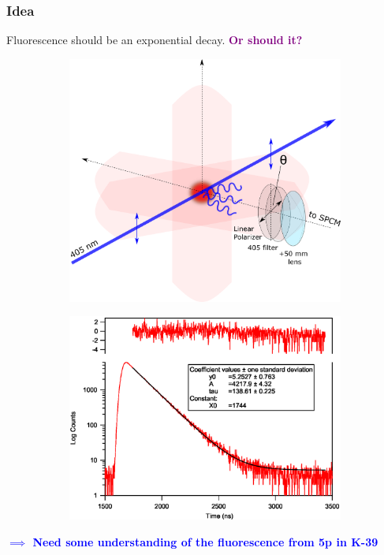 \documentclass{beamer}
\theoremstyle{definition}
\begin{document}
\begin{frame}
\frametitle{Idea}
Fluorescence should be an exponential decay. 
\textcolor{purple}{\textbf{Or should it?}}

\begin{figure}[!htb]
	\vspace{-10pt}
	\centering
	\begin{subfigure}{0.55\textwidth}
		\includegraphics[width=\textwidth]{experimental_geometry}
	\end{subfigure}
	\begin{subfigure}{0.4\textwidth}
		\includegraphics[width=\textwidth]{p12_70ns_pol.eps}
	\end{subfigure}
\end{figure}


\pause
 
\textbf{\textcolor{blue}{$\implies$ Need some understanding of the fluorescence from 5p in K-39}}

\end{frame}
\end{document}
